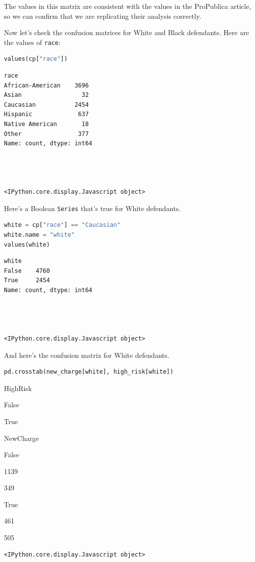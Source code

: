 The values in this matrix are consistent with the values in the
ProPublica article, so we can confirm that we are replicating their
analysis correctly.

Now let's check the confusion matrices for White and Black defendants.
Here are the values of \passthrough{\lstinline!race!}:

\begin{lstlisting}[language=Python,style=source]
values(cp["race"])
\end{lstlisting}

\begin{lstlisting}[style=output]
race
African-American    3696
Asian                 32
Caucasian           2454
Hispanic             637
Native American       18
Other                377
Name: count, dtype: int64




<IPython.core.display.Javascript object>
\end{lstlisting}

Here's a Boolean \passthrough{\lstinline!Series!} that's true for White
defendants.

\begin{lstlisting}[language=Python,style=source]
white = cp["race"] == "Caucasian"
white.name = "white"
values(white)
\end{lstlisting}

\begin{lstlisting}[style=output]
white
False    4760
True     2454
Name: count, dtype: int64




<IPython.core.display.Javascript object>
\end{lstlisting}

And here's the confusion matrix for White defendants.

\begin{lstlisting}[language=Python,style=source]
pd.crosstab(new_charge[white], high_risk[white])
\end{lstlisting}

HighRisk

False

True

NewCharge

False

1139

349

True

461

505

\begin{lstlisting}[style=output]
<IPython.core.display.Javascript object>
\end{lstlisting}

